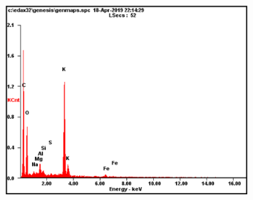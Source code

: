 
\begin{figure}[H]
	\centering
	\includegraphics[width=0.8\textwidth]{media/chem2/image87}
	\caption*{}
\end{figure}

